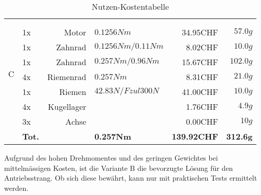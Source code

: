 \begin{table}[h!]
\begin{tabular}{p{0.5cm}p{0.8cm}rp{3cm}rr}
    \multirow{9}[2]{*}{C} 
          &       &                 &                      &          &  \\
          &       &                 &                      &          &  \\
          & 1x    & Motor           & $0.1256 Nm$          & 34.95CHF & $57.0 g$ \\
          & 1x    & Zahnrad         & $0.1256 Nm / 0.11 Nm$& 8.02CHF  & $10.0 g$ \\
          & 1x    & Zahnrad         & $0.257 Nm / 0.96 Nm$ & 15.67CHF & $102.0 g$ \\
          & 4x    & Riemenrad       & $0.257 Nm$           & 8.31CHF  & $21.0 g$ \\
          & 1x    & Riemen          & $42.83 N /Fzul 300 N $ & 41.00CHF & $10.0 g$ \\
          & 4x    & Kugellager      &                      & 1.76CHF  & $4.9 g$ \\
          & 3x    & Achse           &                      & 0.00CHF  & $10 g$ \\
          & \textbf{Tot.} &       & \textbf{0.257Nm} & \textbf{139.92CHF} & \textbf{312.6g} \\
    \end{tabular}%
 	\centering
    \caption{Nutzen-Kostentabelle}
    \label{tab:addlabel}%
\end{table}
Aufgrund des hohen Drehmomentes und des geringen Gewichtes bei mittelmässigen Kosten, ist die Variante B die bevorzugte Lösung für den Antriebsstrang. Ob sich diese bewährt, kann nur mit praktischen Tests ermittelt werden.
